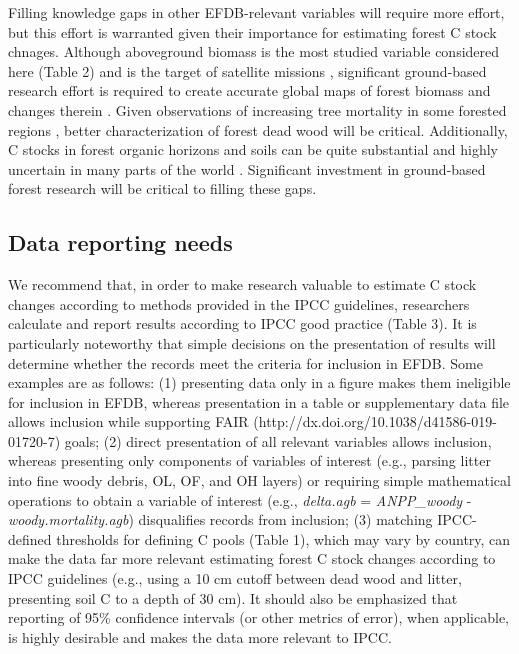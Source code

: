 \documentclass[, manuscript]{copernicus}
\begin{document}
Filling knowledge gaps in other EFDB-relevant variables will require
more effort, but this effort is warranted given their importance for
estimating forest C stock chnages. Although aboveground biomass is the
most studied variable considered here (Table 2) and is the target of
satellite missions
\citep{dubayah_global_2020, quegan_european_2019, nisar_nasaisro_2018},
significant ground-based research effort is required to create accurate
global maps of forest biomass and changes therein
\citep{duncanson_importance_2019, labriere_forest_2023, calders_laser_2022}.
Given observations of increasing tree mortality in some forested regions
\citep{mcdowell_pervasive_2020}, better characterization of forest dead
wood will be critical. Additionally, C stocks in forest organic horizons
and soils can be quite substantial and highly uncertain in many parts of
the world \citep{tifafi_large_2018}. Significant investment in
ground-based forest research will be critical to filling these gaps.

\subsection{Data reporting needs}

We recommend that, in order to make research valuable to estimate C
stock changes according to methods provided in the IPCC guidelines,
researchers calculate and report results according to IPCC good practice
(Table 3). It is particularly noteworthy that simple decisions on the
presentation of results will determine whether the records meet the
criteria for inclusion in EFDB. Some examples are as follows: (1)
presenting data only in a figure makes them ineligible for inclusion in
EFDB, whereas presentation in a table or supplementary data file allows
inclusion while supporting FAIR
(http://dx.doi.org/10.1038/d41586-019-01720-7) goals; (2) direct
presentation of all relevant variables allows inclusion, whereas
presenting only components of variables of interest (e.g., parsing
litter into fine woody debris, OL, OF, and OH layers) or requiring
simple mathematical operations to obtain a variable of interest (e.g.,
\emph{delta.agb} = \emph{ANPP\_woody} - \emph{woody.mortality.agb})
disqualifies records from inclusion; (3) matching IPCC-defined
thresholds for defining C pools (Table 1), which may vary by country,
can make the data far more relevant estimating forest C stock changes
according to IPCC guidelines (e.g., using a 10 cm cutoff between dead
wood and litter, presenting soil C to a depth of 30 cm). It should also
be emphasized that reporting of 95\% confidence intervals (or other
metrics of error), when applicable, is highly desirable and makes the
data more relevant to IPCC.
\end{document}
